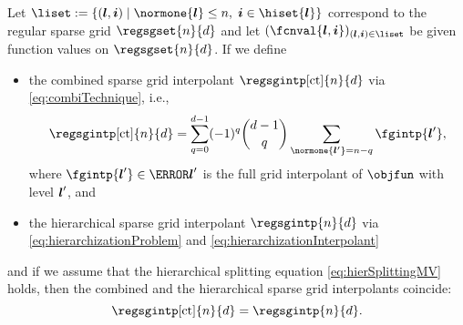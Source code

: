 \begin{theorem}
  \label{thm:combiTechnique}
  Let $\liset := \{(\*l, \*i) \mid
  \normone{\*l} \le n,\; \*i \in \hiset{\*l}\}$
  correspond to the regular sparse grid
  $\regsgset{n}{d}$ and let $(\fcnval{\*l,\*i})_{(\*l,\*i) \in \liset}$
  be given function values on $\regsgset{n}{d}$.
  If we define
  \begin{itemize}
    \item
    the combined sparse grid interpolant $\regsgintp[\ct]{n}{d}$ via
    \eqref{eq:combiTechnique}, i.e.,
    \begin{equation}
      \regsgintp[\ct]{n}{d}
      = \sum_{q=0}^{d-1} (-1)^q \binom{d-1}{q} \sum_{\normone{\*l'} = n-q}
      \fgintp{\*l'},
    \end{equation}
    where $\fgintp{\*l'} \in \ns{\*l'}$ is the full grid interpolant
    of $\objfun$ with level ${\boldsymbol{l}}'$, and
    
    \item
    the hierarchical sparse grid interpolant $\regsgintp{n}{d}$
    via \eqref{eq:hierarchizationProblem} and
    \eqref{eq:hierarchizationInterpolant}
  \end{itemize}
  and if we assume that the hierarchical splitting equation
  \eqref{eq:hierSplittingMV} holds,
  then the combined and the hierarchical sparse grid interpolants coincide:
  \begin{equation}
    \regsgintp[\ct]{n}{d}
    = \regsgintp{n}{d}.
  \end{equation}
\end{theorem}

